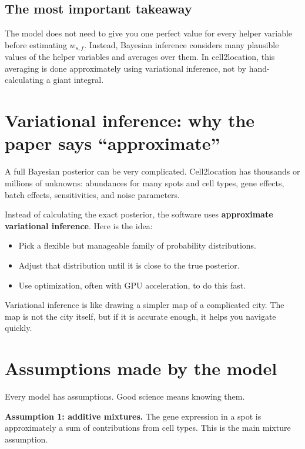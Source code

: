 \documentclass[11pt]{article}
\newcommand{\term}[1]{\textbf{#1}}
\begin{document}
\subsection{The most important takeaway}

\begin{checkpoint}
The model does not need to give you one perfect value for every helper variable before estimating $w_{s,f}$. Instead, Bayesian inference considers many plausible values of the helper variables and averages over them. In cell2location, this averaging is done approximately using variational inference, not by hand-calculating a giant integral.
\end{checkpoint}


\section{Variational inference: why the paper says ``approximate''}

A full Bayesian posterior can be very complicated. Cell2location has thousands or millions of unknowns: abundances for many spots and cell types, gene effects, batch effects, sensitivities, and noise parameters.

Instead of calculating the exact posterior, the software uses \term{approximate variational inference}. Here is the idea:

\begin{itemize}
  \item Pick a flexible but manageable family of probability distributions.
  \item Adjust that distribution until it is close to the true posterior.
  \item Use optimization, often with GPU acceleration, to do this fast.
\end{itemize}

\begin{bigidea}
Variational inference is like drawing a simpler map of a complicated city. The map is not the city itself, but if it is accurate enough, it helps you navigate quickly.
\end{bigidea}

\section{Assumptions made by the model}

Every model has assumptions. Good science means knowing them.

\begin{assumptionbox}
\term{Assumption 1: additive mixtures.} The gene expression in a spot is approximately a sum of contributions from cell types. This is the main mixture assumption.
\end{assumptionbox}
\end{document}
